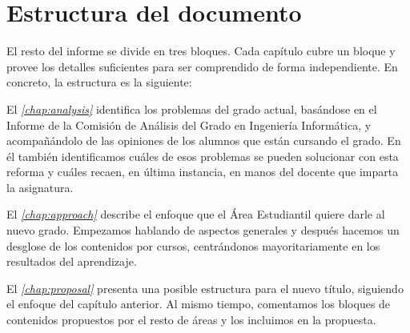 \section{Estructura del documento}

El resto del informe se divide en tres bloques.
Cada capítulo cubre un bloque y provee los detalles suficientes para
ser comprendido de forma independiente.
En concreto, la estructura es la siguiente:

El \emph{\cref{chap:analysis}} identifica los problemas del grado actual,
basándose en
el Informe de la Comisión de Análisis del Grado en Ingeniería Informática,
y acompañándolo de las opiniones de los alumnos que están cursando el grado.
En él también identificamos
cuáles de esos problemas se pueden solucionar con esta reforma y
cuáles recaen, en última instancia,
en manos del docente que imparta la asignatura.

El \emph{\cref{chap:approach}} describe el enfoque que el Área Estudiantil
quiere darle al nuevo grado.
Empezamos hablando de aspectos generales y después
hacemos un desglose de los contenidos por cursos,
centrándonos mayoritariamente en los resultados del aprendizaje.

El \emph{\cref{chap:proposal}} presenta una posible estructura
para el nuevo título,
siguiendo el enfoque del capítulo anterior.
Al mismo tiempo, comentamos los bloques de contenidos
propuestos por el resto de áreas
y los incluimos en la propuesta.
